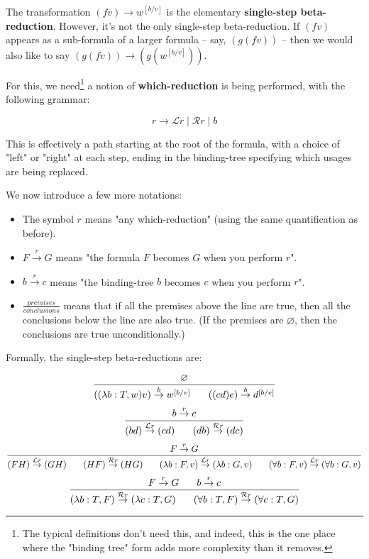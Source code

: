 \documentclass{article}
\newcommand{\presep}{\hspace{1.8em}}
\newcommand{\subst}[3]{#1^{[{#2}{/}{#3}]}}
\newcommand{\betared}[1]{\overset{#1}{\rightarrow}}
\begin{document}
The transformation $(f v) \rightarrow \subst{w}{b}{v}$ is the elementary \textbf{single-step beta-reduction}. However, it's not the only single-step beta-reduction. If $(f v)$ appears as a sub-formula of a larger formula – say, $(g (f v))$ – then we would also like to say $(g (f v)) \rightarrow (g(\subst{w}{b}{v}))$.

For this, we need\footnote{The typical definitions don't need this, and indeed, this is the one place where the "binding tree" form adds more complexity than it removes.} a notion of \textbf{which-reduction} is being performed, with the following grammar:

\[r \rightarrow \mathcal{L}r \mid \mathcal{R}r \mid b\]
  
  This is effectively a path starting at the root of the formula, with a choice of "left" or "right" at each step, ending in the binding-tree specifying which usages are being replaced.

  We now introduce a few more notations:
  
  \begin{itemize}
  \item The symbol $r$ means "any which-reduction" (using the same quantification as before).
  \item $F \betared{r} G$ means "the formula $F$ becomes $G$ when you perform $r$".
  \item $b \betared{r} c$ means "the binding-tree $b$ becomes $c$ when you perform $r$".
  \item $\frac{premises}{conclusions}$ means that if all the premises above the line are true, then all the conclusions below the line are also true. (If the premises are $\varnothing$, then the conclusions are true unconditionally.)
  \end{itemize}
  
  Formally, the single-step beta-reductions are:
  
\[ \frac{\varnothing}{((\lambda b:T,w)v) \betared{b} \subst{w}{b}{v} \presep ((c d) e) \betared{b} \subst{d}{b}{e}} \]
\[ \frac{b \betared{r} c}{(b d) \betared{\mathcal{L}r} (c d) \presep (d b)\betared{\mathcal{R}r} (d c)} \]
\[ \frac{F \betared{r} G}{(F H) \betared{\mathcal{L}r} (G H) \presep (H F) \betared{\mathcal{R}r} (H G) \presep (\lambda b:F,v) \betared{\mathcal{L}r} (\lambda b:G,v) \presep (\forall b:F,v) \betared{\mathcal{L}r} (\forall b:G,v)} \]
\[ \frac{F \betared{r} G \presep b \betared{r} c}{(\lambda b:T,F) \betared{\mathcal{R}r} (\lambda c:T,G) \presep (\forall b:T,F) \betared{\mathcal{R}r} (\forall c:T,G)} \]
\end{document}
